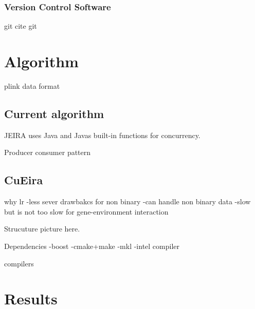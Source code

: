 \documentclass[10pt,a4paper]{report}
\begin{document}
\subsection{Version Control Software}
git
cite git

\clearpage
\chapter{Algorithm}






plink data format

\section{Current algorithm}
JEIRA uses Java and Javas built-in functions for concurrency.

Producer consumer pattern


\section{CuEira}

why lr
-less sever drawbakcs for non binary
-can handle non binary data
-slow but is not too slow for gene-environment interaction

Strucuture picture here.


Dependencies
-boost
-cmake+make
-mkl
-intel compiler

compilers

\chapter{Results}
\end{document}
